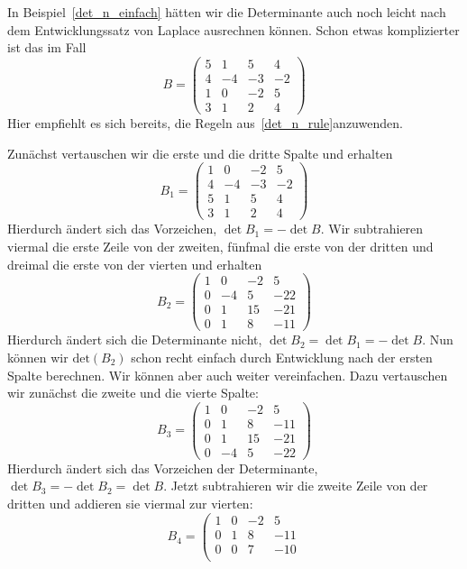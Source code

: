 \begin{beispiel} In Beispiel~\ref{det_n_einfach} hätten wir die Determinante auch noch 
leicht nach dem Entwicklungssatz von Laplace ausrechnen können. Schon etwas komplizierter ist 
das im Fall
  	$$   B = \left( \begin{matrix} 5 & 1 & 5 & 4 \\ 4 & -4 & -3 & -2 \\ 1 & 0 & -2 & 5 \\
  	3 & 1 & 2 & 4  \end{matrix} \right) $$
Hier empfiehlt es sich bereits, die Regeln aus~\ref{det_n_rule}anzuwenden.

Zunächst vertauschen wir die erste und die dritte Spalte und erhalten 
  	$$ B_1 =  \left( \begin{matrix} 1 & 0 & -2 & 5 \\  4 & -4 & -3 & -2 \\ 5 & 1 & 5 & 4 \\
   	3 & 1 & 2 & 4  \end{matrix} \right) $$
Hierdurch ändert sich das Vorzeichen, $\det{B_1} = - \det{B}$. Wir subtrahieren viermal die 
erste Zeile von der zweiten, fünfmal die erste von der dritten und dreimal die erste von der vierten und 
erhalten
  	$$ B_2 =  \left( \begin{matrix} 1 & 0 & -2 & 5 \\  0 & -4 & 5 & -22 \\ 0 & 1 & 15 & -21 \\
   	0 & 1 & 8 & -11  \end{matrix} \right) $$
Hierdurch ändert sich die Determinante nicht,  $\det{B_2} = \det{B_1} = - \det{B}$. 
Nun können wir $\textrm{det}(B_2)$ schon recht einfach durch Entwicklung nach der ersten Spalte berechnen. Wir 
können aber auch weiter vereinfachen. Dazu vertauschen wir zunächst die zweite und die vierte Spalte:
  	$$ B_3 =  \left( \begin{matrix} 1 & 0 & -2 & 5 \\ 0 & 1 & 8 & -11  \\ 0 & 1 & 15 & -21 \\
   	0 & -4 & 5 & -22  \end{matrix} \right) $$
Hierdurch ändert sich das Vorzeichen der Determinante, $\det{B_3}= -\det{B_2} = \det{B}$. 
Jetzt subtrahieren wir die zweite Zeile von der dritten und addieren sie viermal zur vierten:
  	$$ B_4 = \left( \begin{matrix} 1 & 0 & -2 & 5 \\ 0 & 1 & 8 & -11  \\ 0 & 0 & 7 & -10 \\

\end{matrix}$$
\end{beispiel}
